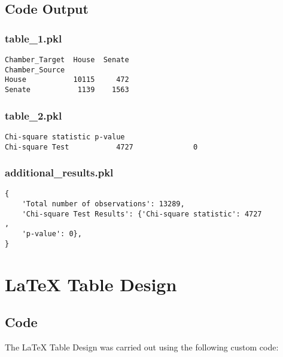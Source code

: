 \documentclass[11pt]{article}
\begin{document}
\subsection{Code Output}

\subsubsection*{table\_1.pkl}

\begin{Verbatim}[tabsize=4]
Chamber_Target  House  Senate
Chamber_Source
House           10115     472
Senate           1139    1563
\end{Verbatim}

\subsubsection*{table\_2.pkl}

\begin{Verbatim}[tabsize=4]
                 Chi-square statistic p-value
Chi-square Test           4727              0
\end{Verbatim}

\subsubsection*{additional\_results.pkl}

\begin{Verbatim}[tabsize=4]
{
    'Total number of observations': 13289,
    'Chi-square Test Results': {'Chi-square statistic': 4727             ,
	'p-value': 0},
}
\end{Verbatim}

\section{LaTeX Table Design}
\subsection{{Code}}
The LaTeX Table Design was carried out using the following custom code:
\end{document}
